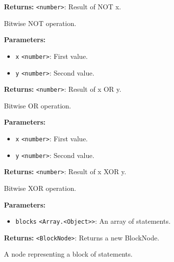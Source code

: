 \documentclass[12pt,a4paper]{article}
\begin{document}
\noindent \textbf{Returns:} \texttt{<number>}: Result of \textasciigrave{}NOT x\textasciigrave{}.

\noindent Bitwise NOT operation.

\vspace{5mm}
\noindent {}


\noindent \textbf{Parameters:}
\begin{itemize}
  \item \texttt{x} \texttt{<number>}: First value.
  \item \texttt{y} \texttt{<number>}: Second value.
\end{itemize}

\noindent \textbf{Returns:} \texttt{<number>}: Result of \textasciigrave{}x OR y\textasciigrave{}.

\noindent Bitwise OR operation.

\vspace{5mm}
\noindent {}


\noindent \textbf{Parameters:}
\begin{itemize}
  \item \texttt{x} \texttt{<number>}: First value.
  \item \texttt{y} \texttt{<number>}: Second value.
\end{itemize}

\noindent \textbf{Returns:} \texttt{<number>}: Result of \textasciigrave{}x XOR y\textasciigrave{}.

\noindent Bitwise XOR operation.

\vspace{5mm}
\noindent {}


\noindent \textbf{Parameters:}
\begin{itemize}
  \item \texttt{blocks} \texttt{<Array.<Object>>}: An array of statements.
\end{itemize}

\noindent \textbf{Returns:} \texttt{<BlockNode>}: Returns a new BlockNode.

\noindent A node representing a block of statements.
\end{document}
